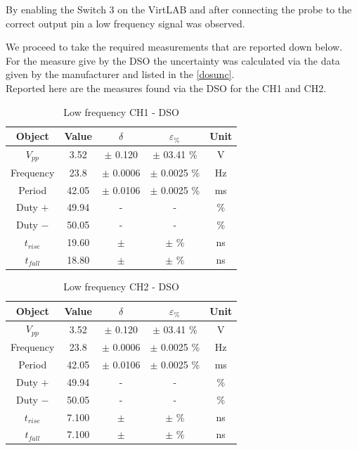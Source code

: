 \documentclass[../main.tex]{subfiles}
\begin{document}
By enabling the Switch 3 on the VirtLAB and after connecting the probe to the correct output pin a low frequency signal was observed.


We proceed to take the required measurements that are reported down below.
For the measure give by the DSO the uncertainty was calculated via the data given by the manufacturer and listed in the \autoref{dosunc}.\\

Reported here are the measures found via the DSO for the CH1 and CH2.



\begin{table}[h!]
\centering	

\begin{tabular}{ccccc}
\textbf{Object} & \textbf{Value} & \textbf{$\delta$} & \textbf{$\varepsilon_{\%}$} &  \textbf{Unit} \\
\hline
 $V_{pp}$ & 3.52  & $\pm$ 0.120 & $\pm$ 03.41 \% &  V \\
 \hline
 Frequency & 23.8 & $\pm$ 0.0006 & $\pm$ 0.0025 \% & Hz \\
 \hline
 Period & 42.05  & $\pm$ 0.0106 & $\pm$ 0.0025 \% & ms \\
 \hline
 Duty $+$ & 49.94  & -  & - &  \% \\ 
 \hline
 Duty $-$ & 50.05  & -  & - &  \% \\ 
 \hline
 $t_{rise}$ & 19.60  & $\pm$  & $\pm$   \% &  ns \\ 
 \hline
 $t_{fall}$ & 18.80 & $\pm$  & $\pm$  \% &  ns \\
 

\end{tabular}
\caption*{Low frequency CH1 - DSO}
\end{table}


\begin{table}[h!]
\centering	

\begin{tabular}{ccccc}
\textbf{Object} & \textbf{Value} & \textbf{$\delta$} & \textbf{$\varepsilon_{\%}$} &  \textbf{Unit} \\
\hline
 $V_{pp}$ & 3.52  & $\pm$ 0.120 & $\pm$ 03.41 \% &  V \\
 \hline
 Frequency & 23.8 & $\pm$ 0.0006 & $\pm$ 0.0025 \% & Hz \\
 \hline
 Period & 42.05  & $\pm$ 0.0106 & $\pm$ 0.0025 \% & ms \\
 \hline
 Duty $+$ & 49.94  & -  & - &  \% \\ 
 \hline
 Duty $-$ & 50.05  & -  & - &  \% \\ 
 \hline
 $t_{rise}$ & 7.100  & $\pm$  & $\pm$   \% &  ns \\ 
 \hline
 $t_{fall}$ & 7.100 & $\pm$  & $\pm$  \% &  ns \\
 

\end{tabular}
\caption*{Low frequency CH2 - DSO}
\end{table}
\end{document}
